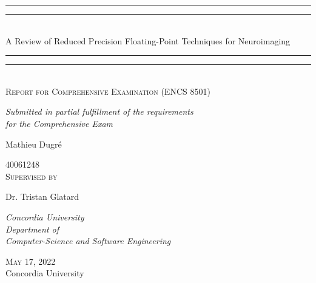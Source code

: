 \documentclass{report}
\begin{document}

\newlength{\drop}
\begin{titlepage}
	\textheight
	\centering
	\vspace*{\baselineskip}
												
	\rule{\textwidth}{1.6pt}\vspace*{-\baselineskip}\vspace*{2pt}
	\rule{\textwidth}{0.4pt}\\[\baselineskip]
	{\LARGE A Review of Reduced Precision Floating-Point Techniques for Neuroimaging}\\[0.2\baselineskip]
	\rule{\textwidth}{0.4pt}\vspace*{-\baselineskip}\vspace{3.2pt}
	\rule{\textwidth}{1.6pt}\\[\baselineskip]
											
	{\scshape Report for Comprehensive Examination (ENCS 8501)}\\
	{\itshape Submitted in partial fulfillment of the requirements \\ for the Comprehensive Exam\par}
	\vspace*{2\baselineskip}
													
	{\Large Mathieu Dugré \par}
	{40061248}\\[2\baselineskip]
	{\scshape Supervised by}\\[0.2\baselineskip]
	{\Large Dr. Tristan Glatard \par}
	{\itshape Concordia University \\  Department of \\ Computer-Science and Software Engineering\par}
													    
	\vfill
	{\scshape May 17, 2022} \\
	{\large Concordia University}\par
\end{titlepage}

\tableofcontents

\clearpage
{}








\end{document}
